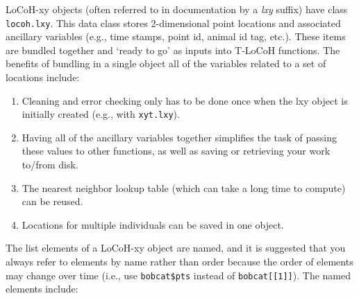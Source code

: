 \documentclass{article}
\begin{document}
LoCoH-xy objects (often referred to in documentation by a \textit{lxy} suffix) have class \texttt{locoh.lxy}. This data class stores 2-dimensional point locations and associated ancillary variables (e.g., time stamps, point id, animal id tag, etc.). These items are bundled together and `ready to go' as inputs into T-LoCoH functions. The benefits of bundling  in a single object all of the variables related to a set of locations include:

\begin{enumerate}
  \item Cleaning and error checking only has to be done once when the lxy object is initially created (e.g., with \texttt{xyt.lxy}).
  \item Having all of the ancillary variables together simplifies the task of passing these values to other functions, as well as saving or retrieving your work to/from disk.
  \item The nearest neighbor lookup table (which can take a long time to compute) can be reused.
  \item Locations for multiple individuals can be saved in one object.
\end{enumerate}

The list elements of a LoCoH-xy object are named, and it is suggested that you always refer to elements by name rather than order because the order of elements may change over time (i.e., use \texttt{bobcat\$pts} instead of \texttt{bobcat[[1]]}). The named elements include:
\end{document}
